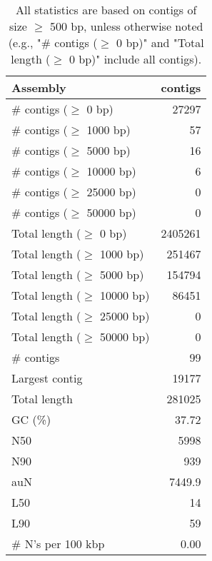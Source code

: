 \documentclass[12pt,a4paper]{article}
\begin{document}
\begin{table}[ht]
\begin{center}
\caption{All statistics are based on contigs of size $\geq$ 500 bp, unless otherwise noted (e.g., "\# contigs ($\geq$ 0 bp)" and "Total length ($\geq$ 0 bp)" include all contigs).}
\begin{tabular}{|l*{1}{|r}|}
\hline
Assembly & contigs \\ \hline
\# contigs ($\geq$ 0 bp) & 27297 \\ \hline
\# contigs ($\geq$ 1000 bp) & 57 \\ \hline
\# contigs ($\geq$ 5000 bp) & 16 \\ \hline
\# contigs ($\geq$ 10000 bp) & 6 \\ \hline
\# contigs ($\geq$ 25000 bp) & 0 \\ \hline
\# contigs ($\geq$ 50000 bp) & 0 \\ \hline
Total length ($\geq$ 0 bp) & 2405261 \\ \hline
Total length ($\geq$ 1000 bp) & 251467 \\ \hline
Total length ($\geq$ 5000 bp) & 154794 \\ \hline
Total length ($\geq$ 10000 bp) & 86451 \\ \hline
Total length ($\geq$ 25000 bp) & 0 \\ \hline
Total length ($\geq$ 50000 bp) & 0 \\ \hline
\# contigs & 99 \\ \hline
Largest contig & 19177 \\ \hline
Total length & 281025 \\ \hline
GC (\%) & 37.72 \\ \hline
N50 & 5998 \\ \hline
N90 & 939 \\ \hline
auN & 7449.9 \\ \hline
L50 & 14 \\ \hline
L90 & 59 \\ \hline
\# N's per 100 kbp & 0.00 \\ \hline
\end{tabular}
\end{center}
\end{table}
\end{document}
